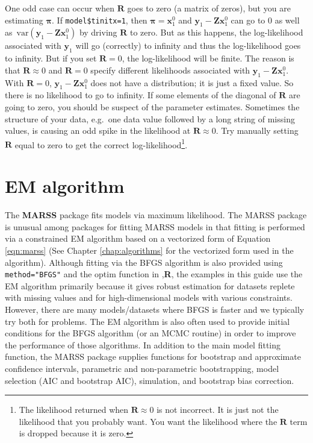 \documentclass[12pt,]{book}
\let\rmarkdownfootnote\footnote%
\def\footnote{\protect\rmarkdownfootnote}
\begin{document}
One odd case can occur when \(\mathbf{R}\) goes to zero (a matrix of zeros), but you are estimating \(\boldsymbol{\pi}\). If \texttt{model\$tinitx=1}, then \(\boldsymbol{\pi}=\mathbf{x}_1^0\) and \(\mathbf{y}_1-\mathbf{Z}\mathbf{x}_1^0\) can go to 0 as well as \(\,\text{var}(\mathbf{y}_1-\mathbf{Z}\mathbf{x}_1^0)\) by driving \(\mathbf{R}\) to zero. But as this happens, the log-likelihood associated with \(\mathbf{y}_1\) will go (correctly) to infinity and thus the log-likelihood goes to infinity. But if you set \(\mathbf{R}=0\), the log-likelihood will be finite. The reason is that \(\mathbf{R} \approx 0\) and \(\mathbf{R}=0\) specify different likelihoods associated with \(\mathbf{y}_1-\mathbf{Z}\mathbf{x}_1^0\). With \(\mathbf{R}=0\), \(\mathbf{y}_1-\mathbf{Z}\mathbf{x}_1^0\) does not have a distribution; it is just a fixed value. So there is no likelihood to go to infinity. If some elements of the diagonal of \(\mathbf{R}\) are going to zero, you should be suspect of the parameter estimates. Sometimes the structure of your data, e.g.~one data value followed by a long string of missing values, is causing an odd spike in the likelihood at \(\mathbf{R} \approx 0\). Try manually setting \(\mathbf{R}\) equal to zero to get the correct log-likelihood\footnote{The likelihood returned when $\mathbf{R} \approx 0$ is not incorrect.  It is just not the likelihood that you probably want.  You want the likelihood where the $\mathbf{R}$ term is dropped because it is zero.}.

\hypertarget{em-algorithm}{%
\chapter{EM algorithm}\label{em-algorithm}}

The \textbf{MARSS} package fits models via maximum likelihood. The MARSS package is unusual among packages for fitting MARSS models in that fitting is performed via a constrained EM algorithm \citep{Holmes2010} based on a vectorized form of Equation \ref{eqn:marss} (See Chapter \ref{chap:algorithms} for the vectorized form used in the algorithm). Although fitting via the BFGS algorithm is also provided using \texttt{method="BFGS"} and the optim function in ,\textbf{R}, the examples in this guide use the EM algorithm primarily because it gives robust estimation for datasets replete with missing values and for high-dimensional models with various constraints. However, there are many models/datasets where BFGS is faster and we typically try both for problems. The EM algorithm is also often used to provide initial conditions for the BFGS algorithm (or an MCMC routine) in order to improve the performance of those algorithms. In addition to the main model fitting function, the MARSS package supplies functions for bootstrap and approximate confidence intervals, parametric and non-parametric bootstrapping, model selection (AIC and bootstrap AIC), simulation, and bootstrap bias correction.
\end{document}
